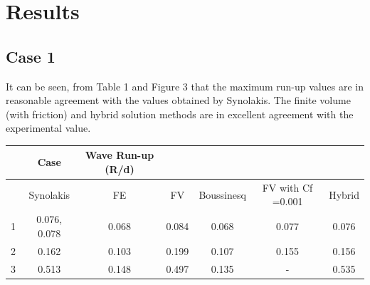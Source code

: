 \section{Results}
\subsection{Case 1}

It can be seen, from Table 1 and Figure 3 that the maximum run-up values are in reasonable agreement with the values obtained by Synolakis.  The finite volume (with friction) and hybrid solution methods are in excellent agreement with the experimental value.

\begin{table}[H]
  \begin{center}
  \begin{tabular*}{.9\textwidth}{|*{7}{c|}}
\hline
  & Case          & Wave Run-up (R/d) & & & & \\
\hline
  & Synolakis    & FE    & FV    & Boussinesq & FV with Cf =0.001 & Hybrid \\
\hline
1 & 0.076, 0.078 & 0.068 & 0.084 & 0.068      & 0.077 & 0.076 \\
\hline
2 & 0.162        & 0.103 & 0.199 & 0.107      & 0.155 & 0.156 \\
\hline
3 & 0.513        & 0.148 & 0.497 & 0.135      & -     & 0.535 \\
\hline
  \end{tabular*}
  \end{center}
\end{table}

